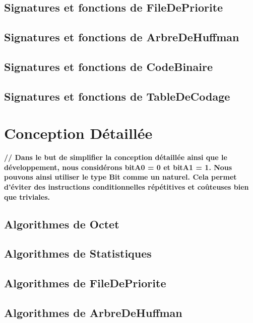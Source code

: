 \documentclass[10pt]{report}
\begin{document}
            \subsection{Signatures et fonctions de FileDePriorite}
            
            \subsection{Signatures et fonctions de ArbreDeHuffman}
            
            \subsection{Signatures et fonctions de CodeBinaire}
            
            \subsection{Signatures et fonctions de TableDeCodage}
            

        \newpage
        \section{Conception Détaillée}
            \textbf{// Dans le but de simplifier la conception détaillée ainsi que le développement, nous considérons bitA0 = 0 et bitA1 = 1. Nous pouvons ainsi utiliser le type Bit comme un naturel. Cela permet d'éviter des instructions conditionnelles répétitives et coûteuses bien que triviales.}
            \subsection{Algorithmes de Octet}
            
            \subsection{Algorithmes de Statistiques}
            
            \subsection{Algorithmes de FileDePriorite}
            
            \subsection{Algorithmes de ArbreDeHuffman}
            
\end{document}
